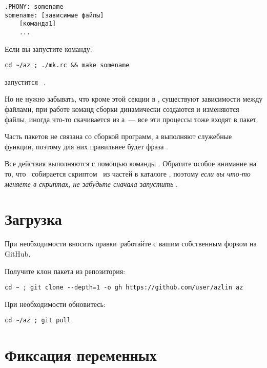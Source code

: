 \begin{verbatim}
.PHONY: somename
somename: [зависимые файлы]
    [команда1]
    ...
\end{verbatim}

Если вы запустите команду:

\begin{verbatim}
cd ~/az ; ./mk.rc && make somename
\end{verbatim}

запустится \ .

Но не нужно забывать, что кроме этой секции в , существуют зависимости
между файлами, при работе команд сборки динамически создаются и изменяются
файлы, иногда что-то скачивается из \internet а\ --- все эти процессы тоже
входят в пакет.

\bigskip
Часть пакетов не связана со сборкой программ, а выполняют служебные функции,
поэтому для них правильнее будет фраза . 

\bigskip
Все действия выполняются с помощью команды . Обратите особое
внимание на то, что \ собирается скриптом \ из частей
в каталоге , поэтому \emph{если вы что-то меняете в скриптах, не
забудьте сначала запустить }.


\section{Загрузка}

При необходимости вносить правки\ работайте с вашим
собственным форком на GitHub.

Получите клон пакета из репозитория:

\begin{verbatim}
cd ~ ; git clone --depth=1 -o gh https://github.com/user/azlin az
\end{verbatim}

При необходимости обновитесь:

\begin{verbatim}
cd ~/az ; git pull
\end{verbatim}

\section{Фиксация переменных}

